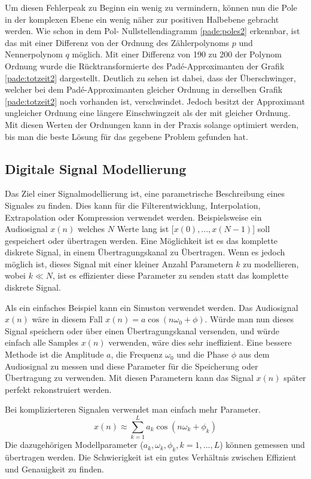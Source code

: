 Um diesen Fehlerpeak zu Beginn ein wenig zu vermindern, können nun die Pole in der komplexen Ebene ein wenig näher zur positiven Halbebene gebracht werden.
Wie schon in  dem Pol- Nullstellendiagramm \ref{pade:poles2} erkennbar, ist das mit einer Differenz von der Ordnung des Zählerpolynoms $p$ und Nennerpolynom $q$ möglich.
Mit einer Differenz von 190 zu 200 der Polynom Ordnung wurde die Rücktransformierte des Padé-Approximanten der Grafik \ref{pade:totzeit2} dargestellt.
Deutlich zu sehen ist dabei, dass der Überschwinger, welcher bei dem Padé-Approximanten gleicher Ordnung in derselben Grafik \ref{pade:totzeit2} noch vorhanden ist, verschwindet.
Jedoch besitzt der Approximant ungleicher Ordnung eine längere Einschwingzeit als der mit gleicher Ordnung. 
Mit diesen Werten der Ordnungen kann in der Praxis solange optimiert werden, bis man die beste Lösung für das gegebene Problem gefunden hat.


\subsection{Digitale Signal Modellierung
	\label{pade:subsection:SignalMod}}

Das Ziel einer Signalmodellierung ist, eine parametrische Beschreibung eines Signales zu finden.
Dies kann für die Filterentwicklung, Interpolation, Extrapolation oder Kompression verwendet werden.
Beispielsweise ein Audiosignal $x(n)$ welches $N$ Werte lang ist [$x(0),...,x(N-1)$] soll gespeichert oder übertragen werden.
Eine Möglichkeit ist es das komplette diskrete Signal, in einem Übertragungskanal zu Übertragen.
Wenn es jedoch möglich ist, dieses Signal mit einer kleiner Anzahl Parametern $k$ zu modellieren, wobei $k\ll N$, ist es effizienter diese Parameter zu senden statt das komplette diskrete Signal.

Als ein einfaches Beispiel kann ein Sinuston verwendet werden.
Das Audiosignal $x(n)$ wäre in diesem Fall $x(n)= a \cos(n\omega_0 + \phi)$.
Würde man nun dieses Signal speichern oder über einen Übertragungskanal versenden, und würde einfach alle Samples $x(n)$ verwenden, wäre dies sehr ineffizient.
Eine bessere Methode ist die Amplitude $a$, die Frequenz $\omega_0$ und die Phase $\phi$ aus dem Audiosignal zu messen und diese Parameter für die Speicherung oder Übertragung zu verwenden.
Mit diesen Parametern kann das Signal $x(n)$ später perfekt rekonstruiert werden.

Bei komplizierteren Signalen verwendet man einfach mehr Parameter.
\begin{equation}
x(n) \approx \sum_{k=1}^{L} a_{k} \cos \left(n \omega_{k}+\phi_{k}\right)
\end{equation}
Die dazugehörigen Modellparameter ($a_k,\omega_{k},\phi_{k},k=1,...,L$) können gemessen und übertragen werden.
Die Schwierigkeit ist ein gutes Verhältnis zwischen Effizient und Genauigkeit zu finden. 


